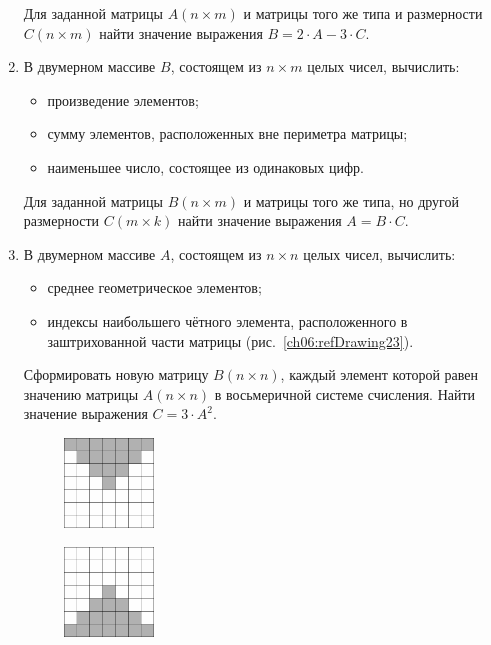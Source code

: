 \begin{enumerate}
Для заданной матрицы $A(n\times m)$ и матрицы того же типа и размерности
$C(n\times m)$ найти значение выражения  $B=2\cdot A-3\cdot C$.
\item В двумерном массиве $B$, состоящем из $n\times m$ целых чисел, вычислить:

\begin{itemize}
\item произведение элементов;
\item сумму элементов, расположенных вне периметра матрицы;
\item наименьшее число, состоящее из одинаковых цифр.
\end{itemize}

Для заданной матрицы $B(n\times m)$ и матрицы того же типа, но другой размерности
$C(m\times k)$ найти значение выражения  $A=B\cdot C$.
\item В двумерном массиве $A$, состоящем из $n\times n$ целых чисел, вычислить:

\begin{itemize}
\item среднее геометрическое элементов;
\item индексы наибольшего чётного элемента, расположенного в заштрихованной части матрицы (рис.~\ref{ch06:refDrawing23}).
\end{itemize}

Сформировать новую матрицу $B(n\times n)$, каждый элемент которой равен значению матрицы
$A(n\times n)$ в восьмеричной системе счисления. Найти
значение выражения  $C=3\cdot A^2$.

\begin{figure}%
\begin{floatrow}[4]
\ffigbox[\FBwidth]
{%
\captionsetup{labelfont=footnotesize}\caption{}%
\label{ch06:refDrawing23}}
{\includegraphics[width=0.225\textwidth,keepaspectratio]{img/ris_6_24}}%

\ffigbox[\FBwidth]
{\caption{}%
\label{ch06:refDrawing24}}
{\includegraphics[width=0.225\textwidth,keepaspectratio]{img/ris_6_25}}%


\end{floatrow}
\end{figure}
\end{enumerate}
